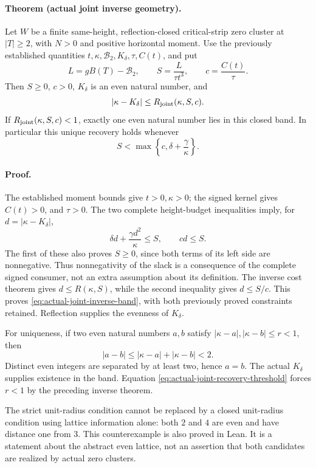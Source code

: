 \paragraph{Theorem (actual joint inverse geometry).}
Let \(W\) be a finite same-height, reflection-closed critical-strip
zero cluster at \(|T|\ge2\), with \(N>0\) and positive horizontal
moment.  Use the previously established quantities
\(t,\kappa,\mathcal B_2,K_\delta,\tau,C(t)\), and put
\[
 L=gB(T)-\mathcal B_2,\qquad
 S=\frac{L}{\tau t^3},\qquad c=\frac{C(t)}{\tau}.
\]
Then \(S\ge0\), \(c>0\), \(K_\delta\) is an even natural number, and
\begin{equation}
 |\kappa-K_\delta|
 \le R_{\rm joint}(\kappa,S,c).
 \label{eq:actual-joint-inverse-band}
\end{equation}
If \(R_{\rm joint}(\kappa,S,c)<1\), exactly one even natural number
lies in this closed band.  In particular this unique recovery holds
whenever
\begin{equation}
 S<\max\left\{c,\delta+\frac{\gamma}{\kappa}\right\}.
 \label{eq:actual-joint-recovery-threshold}
\end{equation}

\paragraph{Proof.}
The established moment bounds give \(t>0,\kappa>0\);
the signed kernel gives \(C(t)>0\), and \(\tau>0\).
The two complete height-budget inequalities imply, for
\(d=|\kappa-K_\delta|\),
\[
 \delta d+\frac{\gamma d^2}{\kappa}\le S,\qquad cd\le S.
\]
The first of these also proves \(S\ge0\), since both terms of
its left side are nonnegative.  Thus nonnegativity of the slack is
a consequence of the complete signed consumer, not an extra
assumption about its definition.
The inverse cost theorem gives \(d\le R(\kappa,S)\), while the
second inequality gives \(d\le S/c\).
This proves \eqref{eq:actual-joint-inverse-band}, with both
previously proved constraints retained.
Reflection supplies the evenness of \(K_\delta\).

For uniqueness, if two even natural numbers \(a,b\) satisfy
\(|\kappa-a|,|\kappa-b|\le r<1\), then
\[
 |a-b|\le|\kappa-a|+|\kappa-b|<2.
\]
Distinct even integers are separated by at least two, hence \(a=b\).
The actual \(K_\delta\) supplies existence in the band.
Equation \eqref{eq:actual-joint-recovery-threshold} forces \(r<1\)
by the preceding inverse theorem.

The strict unit-radius condition cannot be replaced by a closed
unit-radius condition using lattice information alone: both \(2\)
and \(4\) are even and have distance one from \(3\).
This counterexample is also proved in Lean.  It is a statement
about the abstract even lattice, not an assertion that both
candidates are realized by actual zero clusters.

